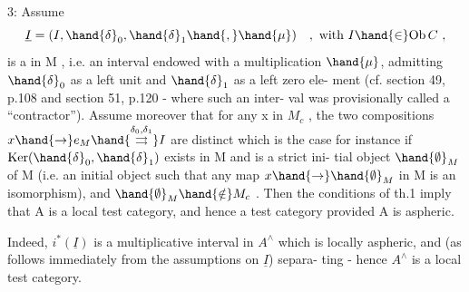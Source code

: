 \hand{\uline{\textcolor{black}{Corollary}}} 3:  Assume
\[ \underline{I} = (I, \hand{\delta}_0, \hand{\delta}_1\hand{,} \hand{\mu}) \quad , \text{ with } I \hand{\in} \mathrm{Ob}\, C \ , \]
is a \hand{\uline{\textcolor{black}{multiplicative interval}}} in M ,  i.e. an interval endowed with a
multiplication $\hand{\mu}$, admitting $\hand{\delta}_0$ as a left unit and $\hand{\delta}_1$ as a left zero ele-%
ment (cf. section 49, p.108  and section 51, p.120  - where such an inter-%
val was provisionally called a ``contractor'').  Assume moreover that for
any x in $M_c$ ,  the two compositions  $x \hand{\to} e_M \hand{\overset{\delta_0,\delta_1}{\rightrightarrows}} I$  are distinct\hand{(}  which
is the case for instance if  $\mathrm{Ker}(\hand{\delta}_0,\hand{\delta}_1)$  exists in M and is a strict ini-%
tial object $\hand{\emptyset}_M$  of M  (i.e. an initial object such that any map $x \hand{\to} \hand{\emptyset}_M$ in
M is an isomorphism),  and  $\hand{\emptyset}_M \hand{\notin} M_c$ \hand{)}. Then the conditions of th.1  imply
that A is a local test category,  and hence a test category provided A is
aspheric.

Indeed,  $i^*(\underline{I})$  is a multiplicative interval in $A^\wedge$ which is locally
aspheric,  and (as follows immediately from the assumptions on $\underline{I}$) separa-%
ting  -  hence $A^\wedge$ is a local test category.


